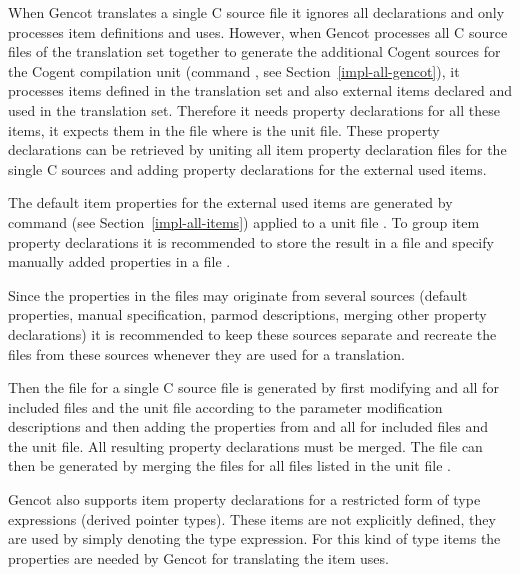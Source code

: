 When Gencot translates a single C source file it ignores all declarations and only processes item definitions and uses. 
However, when Gencot processes all C source files of the translation set together to generate the additional Cogent sources for the
Cogent compilation unit (command , see Section~\ref{impl-all-gencot}), it processes items defined in the
translation set and also external items declared and used in the translation set. Therefore it needs property declarations 
for all these items, it expects them in the file  where  is the unit file. 
These property declarations can be retrieved by uniting all item property declaration files for the single C sources and adding
property declarations for the external used items. 

The default item properties for the external used items are generated by command  (see Section~\ref{impl-all-items})
applied to a unit file . To group item property declarations it is recommended to store the result in a file
 and specify manually added properties in a file .

Since the properties in the  files may originate from several sources (default properties, manual specification, 
parmod descriptions, merging other property declarations) it is recommended to keep these sources separate and recreate
the  files from these sources whenever they are used for a translation. 

Then the file  for a single C source file is generated by first modifying  
and all  for included files  and the unit file according to the parameter modification descriptions 
and then adding the properties from  and all  for included files  and the unit 
file. All resulting property declarations must be merged. The file  can then be generated by 
merging the  files for all files  listed in the unit file .

Gencot also supports item property declarations for a restricted form of type expressions (derived pointer types). These items
are not explicitly defined, they are used by simply denoting the type expression. For this kind of type items the properties are 
needed by Gencot for translating the item uses. 

